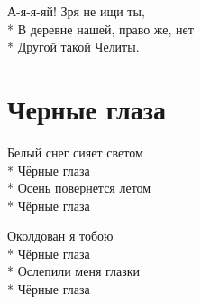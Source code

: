 \medskip

\begin{minipage}{\linewidth}
\hspace*{1.5em}А-я-я-яй! Зря не ищи ты,\\*
\hspace*{1.5em}В деревне нашей, право же, нет\\*
\hspace*{1.5em}Другой такой Челиты.\\
\end{minipage}

\vspace{\fill}\newpage

\section{Черные глаза}
\label{song:Черные_глаза}

\medskip

\begin{minipage}{\linewidth}
Белый снег сияет светом\\*
Чёрные глаза\\*
Осень повернется летом\\*
Чёрные глаза\\
\end{minipage}\par\medskip\nobreak

\medskip

\begin{minipage}{\linewidth}
Околдован я тобою\\*
Чёрные глаза\\*
Ослепили меня глазки\\*
Чёрные глаза\\
\end{minipage}\par\medskip\nobreak

\medskip

